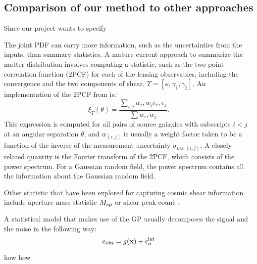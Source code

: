 \subsection{Comparison of our method to other approaches}
  Since our project wants to specify 

The joint PDF can carry more information,
such as the uncertainties from the inputs, 
than summary statistics. 
A mature current approach to summarize the matter distribution 
involves computing a statistic, such
as the two-point correlation function (2PCF) for each of the lensing
observables, including the convergence and the two components of shear, 
$\Upsilon = [\kappa, \gamma_1, \gamma_2]$. 
An implementation of the 2PCF from \cite{Jee2013a} is: 
\begin{equation}
	\xi_\Upsilon(\theta) = \frac{\sum_{i,j}w_i, w_j e_i, e_j}{\sum w_i, w_j}.
	\label{eqn:2PCF}
\end{equation}
This expression is computed 
for all pairs of source galaxies with subscripts $i < j$ at an angular separation 
$\theta$, and $w_{(i, j)}$ is usually
a weight factor taken to be a function of 
the inverse of the measurement uncertainty $\sigma_{ms; (i, j)}$.  
A closely related quantity is the Fourier transform of the 2PCF, which consists
of the power spectrum. For a Gaussian random field, the power spectrum contains
all the information about the Gaussian random field. 


Other statistic that have been explored for capturing cosmic shear information
include aperture mass statistic $M_{\rm ap}$ or shear peak count \citep{Bard2014}.

A statistical model that makes use of the GP usually decomposes 
the signal and the noise in the following way: 
\begin{equation}
	e_{\rm obs} = g(\mathbf{x}) + \epsilon_n^{\rm int}  
\end{equation}

how how  

